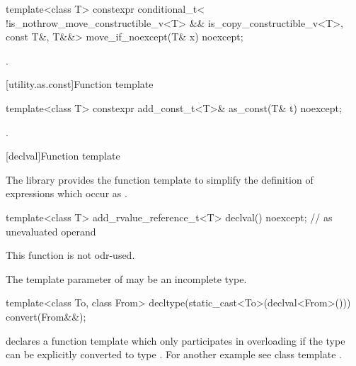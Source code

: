 %
\begin{itemdecl}
template<class T> constexpr conditional_t<
    !is_nothrow_move_constructible_v<T> && is_copy_constructible_v<T>, const T&, T&&>
  move_if_noexcept(T& x) noexcept;
\end{itemdecl}

\begin{itemdescr}
\pnum
\returns
{}.
\end{itemdescr}

[utility.as.const]{Function template }

%
\begin{itemdecl}
template<class T> constexpr add_const_t<T>& as_const(T& t) noexcept;
\end{itemdecl}

\begin{itemdescr}
\pnum
\returns
{}.
\end{itemdescr}

[declval]{Function template }

\pnum
The library provides the function template  to simplify the definition of
expressions which occur as .

%
\begin{itemdecl}
template<class T> add_rvalue_reference_t<T> declval() noexcept;    // as unevaluated operand
\end{itemdecl}

\begin{itemdescr}
\pnum
\mandates
This function is not odr-used.

\pnum
\remarks
The template parameter  of  may be an incomplete type.
\end{itemdescr}

\pnum
\begin{example}
\begin{codeblock}
template<class To, class From> decltype(static_cast<To>(declval<From>())) convert(From&&);
\end{codeblock}
declares a function template  which only participates in overloading if the
type  can be explicitly converted to type . For another example see class
template .
\end{example}

